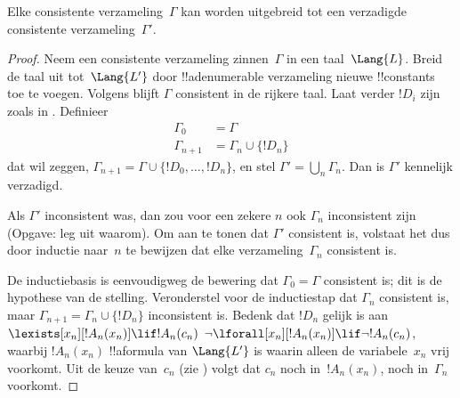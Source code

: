 \documentclass[../../../include/open-logic-section]{subfiles}
\begin{document}
\begin{lem}
Elke consistente verzameling~$\Gamma$ kan worden uitgebreid tot een
verzadigde consistente verzameling~$\Gamma'$.
\end{lem}

\begin{proof}
Neem een consistente verzameling zinnen~$\Gamma$ in een taal~$\Lang{L}$.
Breid de taal uit tot~$\Lang{L'}$ door !!a{denumerable} verzameling
nieuwe !!{constant}s toe te voegen. Volgens  blijft
$\Gamma$ consistent in de rijkere taal. Laat verder $!D_i$ zijn zoals
in . Definieer
\begin{align*}
\Gamma_0 & = \Gamma \\
\Gamma_{n+1} & = \Gamma_n \cup \{!D_n \}
\end{align*}
dat wil zeggen, $\Gamma_{n+1} = \Gamma \cup \{ !D_0, \dots, !D_n \}$,
en stel $\Gamma' = \bigcup_{n} \Gamma_n$. Dan is $\Gamma'$ kennelijk
verzadigd.

Als $\Gamma'$ inconsistent was, dan zou voor een zekere $n$ ook
$\Gamma_n$ inconsistent zijn (Opgave: leg uit waarom). Om aan te tonen
dat $\Gamma'$ consistent is, volstaat het dus door inductie naar~$n$ te
bewijzen dat elke verzameling~$\Gamma_n$ consistent is.

De inductiebasis is eenvoudigweg de bewering dat $\Gamma_0 = \Gamma$
consistent is; dit is de hypothese van de stelling. Veronderstel voor de
inductiestap dat $\Gamma_{n}$ consistent is, maar $\Gamma_{n+1} =
\Gamma_n \cup \{!D_n\}$ inconsistent is. Bedenk dat $!D_n$ gelijk is aan
{$\lexists[x_{n}][!A_{n}(x_n)] \lif !A_{n}(c_{n})$}
{$\lnot\lforall[x_{n}][!A_{n}(x_n)] \lif \lnot !A_{n}(c_{n})$},
waarbij $!A_n(x_n)$ !!a{formula} van $\Lang{L'}$ is waarin alleen de
variabele~$x_n$ vrij voorkomt. Uit de keuze van~$c_n$ (zie
) volgt dat $c_n$ noch in~$!A_n(x_n)$, noch
in~$\Gamma_n$ voorkomt.


\end{proof}
\end{document}
